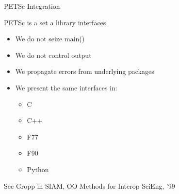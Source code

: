 \begin{frame}{PETSc Integration}

PETSc is a set a library interfaces
\begin{itemize}
  \item We do not seize {\kb main()}
  \item We do not control output
  \item We propagate errors from underlying packages
  \item We present the same interfaces in:
  \begin{itemize}
    \item C
    \item C++
    \item F77
    \item F90
    \item Python
  \end{itemize}
\end{itemize}

\begin{center}\small
See Gropp in SIAM, OO Methods for Interop SciEng, '99
\end{center}

\end{frame}
